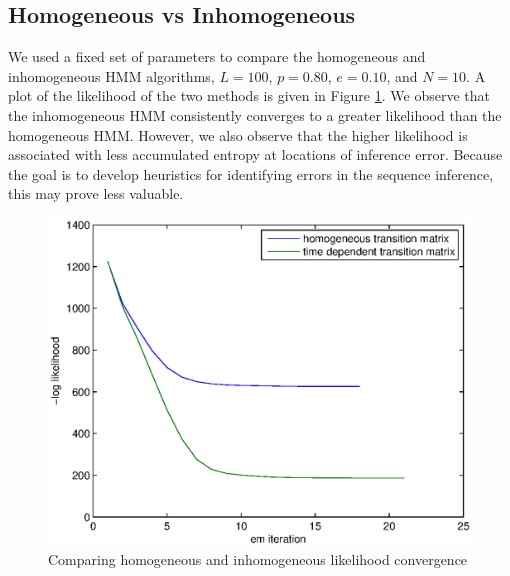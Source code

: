 \subsection{Homogeneous vs Inhomogeneous}
We used a fixed set of parameters to compare the homogeneous and inhomogeneous HMM algorithms, $L=100$, $p=0.80$, $e=0.10$, and $N=10$. A plot of the likelihood of the two methods is given in Figure \ref{fig:tIndep_vs_tDep}. We observe that the inhomogeneous HMM consistently converges to a greater likelihood than the homogeneous HMM. However, we also observe that the higher likelihood is associated with less accumulated entropy at locations of inference error. Because the goal is to develop heuristics for identifying errors in the sequence inference, this may prove less valuable. 

\begin{figure}[h!]
\centering
\includegraphics[width=.5\textwidth]{fig/homog_vs_tDep_L100_p80_e10_N10}
\caption{Comparing homogeneous and inhomogeneous likelihood convergence}
\label{fig:tIndep_vs_tDep}
\end{figure}


